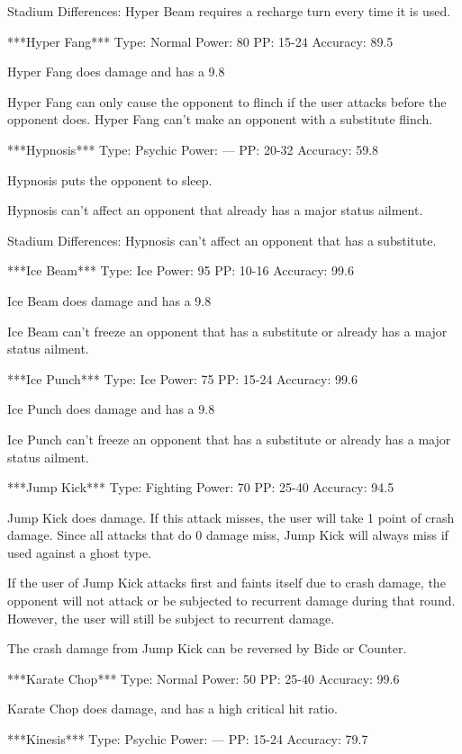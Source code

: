 \documentclass[reprint, aps, prl, paper=A4]{revtex4-1}
\begin{document}
Stadium Differences:
Hyper Beam requires a recharge turn every time it is used.


***Hyper Fang***
Type: Normal
Power: 80
PP: 15-24
Accuracy: 89.5%

Hyper Fang does damage and has a 9.8%

Hyper Fang can only cause the opponent to flinch if the user attacks before the opponent does.
Hyper Fang can't make an opponent with a substitute flinch.


***Hypnosis***
Type: Psychic
Power: ---
PP: 20-32
Accuracy: 59.8%

Hypnosis puts the opponent to sleep.

Hypnosis can't affect an opponent that already has a major status ailment.

Stadium Differences:
Hypnosis can't affect an opponent that has a substitute.


***Ice Beam***
Type: Ice
Power: 95
PP: 10-16
Accuracy: 99.6%

Ice Beam does damage and has a 9.8%

Ice Beam can't freeze an opponent that has a substitute or already has a major status ailment.


***Ice Punch***
Type: Ice
Power: 75
PP: 15-24
Accuracy: 99.6%

Ice Punch does damage and has a 9.8%

Ice Punch can't freeze an opponent that has a substitute or already has a major status
ailment.


***Jump Kick***
Type: Fighting
Power: 70
PP: 25-40
Accuracy: 94.5%

Jump Kick does damage. If this attack misses, the user will take 1 point of crash damage. Since
all attacks that do 0 damage miss, Jump Kick will always miss if used against a ghost type.

If the user of Jump Kick attacks first and faints itself due to crash damage, the opponent will
not attack or be subjected to recurrent damage during that round. However, the user will still
be subject to recurrent damage.

The crash damage from Jump Kick can be reversed by Bide or Counter.


***Karate Chop***
Type: Normal
Power: 50
PP: 25-40
Accuracy: 99.6%

Karate Chop does damage, and has a high critical hit ratio.


***Kinesis***
Type: Psychic
Power: ---
PP: 15-24
Accuracy: 79.7%
\end{document}
